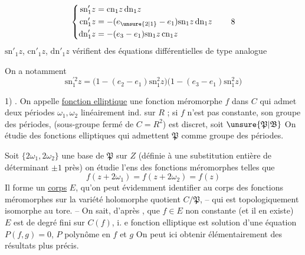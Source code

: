 \[
\left\{\begin{aligned}
\mathrm{sn}'_1z&=\mathrm{cn}_1z\,\mathrm{dn}_1z\\
\mathrm{cn}'_1z&=-(e_{\unsure{2|1}}-e_1)\mathrm{sn}_1z\,\mathrm{dn}_1z\\
\mathrm{dn}'_1z&=-(e_3-e_1)\mathrm{sn}_1z\,\mathrm{cn}_1z
\end{aligned}\right.\tag*{8}
\]
$\mathrm{sn}'_1z$, $\mathrm{cn}'_1z$, $\mathrm{dn}'_1z$ vérifient des équations différentielles de type analogue

On a notamment
\[
\mathrm{sn}_1^{\prime 2}z=\bigl(1-(e_2-e_1)\mathrm{sn}_1^2z\bigr)
\bigl(1-(e_3-e_1)\mathrm{sn}_1^2z\bigr)\tag*{(9)}
\]

\begin{center}\end{center}


1) . On appelle \uline{fonction elliptique} une fonction méromorphe $f$ dans $C$ qui admet deux périodes $\omega_1,\omega_2$ linéairement ind. sur $R$ ; si $f$ n'est pas constante, son groupe des périodes, (sous-groupe fermé de $C=R^2$) est discret, soit $\unsure{\mathfrak P|\mathfrak B}$ On étudie  des fonctions elliptiques qui admettent $\mathfrak P$ comme groupe des périodes.

 Soit $\{2\omega_1,2\omega_2\}$ une base de $\mathfrak P$ sur $Z$ (définie à une substitution entière de déterminant $\pm1$ près) on étudie l'ens des fonctions méromorphes telles que
\[
f(z+2\omega_1)=f(z+2\omega_2)=f(z)\tag*{(1)}
\]
Il forme un \uline{corps} $E$, qu'on peut évidemment identifier au corps des fonctions méromorphes sur la variété holomorphe quotient $C/\mathfrak P$, -- qui est topologiquement isomorphe au tore. -- On sait, d'après    , que    $f\in E$ non constante  (et il en existe)  $E$ est de degré fini sur $C(f)$, i. e  fonction elliptique  est  solution d'une équation $P(f,g)=0$, $P$ polynôme en $f$ et $g$  On peut ici obtenir élémentairement des résultats plus précis.

